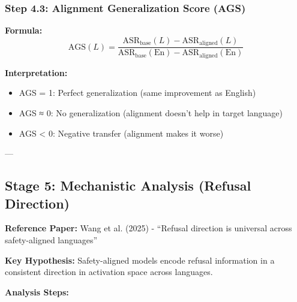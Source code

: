 \documentclass[11pt,a4paper]{article}
\begin{document}
\subsubsection{Step 4.3: Alignment Generalization Score (AGS)}

\textbf{Formula:}
$$\text{AGS}(L) = \frac{\text{ASR}_{\text{base}}(L) - \text{ASR}_{\text{aligned}}(L)}{\text{ASR}_{\text{base}}(\text{En}) - \text{ASR}_{\text{aligned}}(\text{En})}$$

\textbf{Interpretation:}
\begin{itemize}
    \item AGS = 1: Perfect generalization (same improvement as English)
    \item AGS ≈ 0: No generalization (alignment doesn't help in target language)
    \item AGS < 0: Negative transfer (alignment makes it worse)
\end{itemize}

---

\subsection{Stage 5: Mechanistic Analysis (Refusal Direction)}

\textbf{Reference Paper:} Wang et al. (2025) - ``Refusal direction is universal across safety-aligned languages''

\textbf{Key Hypothesis:} Safety-aligned models encode refusal information in a consistent direction in activation space across languages.

\textbf{Analysis Steps:}
\end{document}
